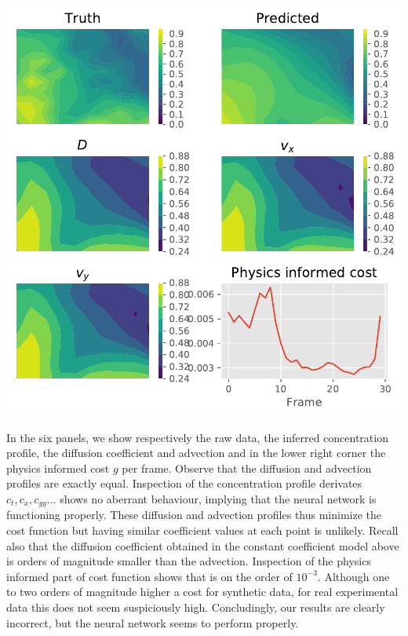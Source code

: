 \documentclass{Dissertate}
\let\origfigure\figure
\let\endorigfigure\endfigure
\renewenvironment{figure}[1][2] {
    \expandafter\origfigure\expandafter[H]
} {
    \endorigfigure
}
\begin{document}
\begin{figure}
\hypertarget{fig:nnfull}{%
\centering
\includegraphics{source/figures/pdf/NN_Man_full.pdf}
\caption{We show the raw data, inferred concentration, diffusion and advection fields and the physics informed cost as a function of the frames.}\label{fig:nnfull}
}
\end{figure}

In the six panels, we show respectively the raw data, the inferred
concentration profile, the diffusion coefficient and advection and in
the lower right corner the physics informed cost \(g\) per frame.
Observe that the diffusion and advection profiles are exactly equal.
Inspection of the concentration profile derivates
\(c_t, c_x, c_{yy}...\) shows no aberrant behaviour, implying that the
neural network is functioning properly. These diffusion and advection
profiles thus minimize the cost function but having similar coefficient
values at each point is unlikely. Recall also that the diffusion
coefficient obtained in the constant coefficient model above is orders of
magnitude smaller than the advection. Inspection of the physics informed
part of cost function shows that is on the order of \(10^{-3}\).
Although one to two orders of magnitude higher a cost for synthetic data, for
real experimental data this does not seem suspiciously high. Concludingly, our results are clearly incorrect, but the neural network seems to
perform properly. 
\end{document}
